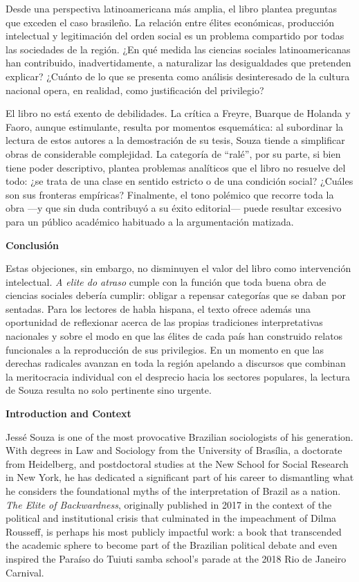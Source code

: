 Desde una perspectiva latinoamericana más amplia, el libro plantea preguntas que exceden el caso brasileño. La relación entre élites económicas, producción intelectual y legitimación del orden social es un problema compartido por todas las sociedades de la región. ¿En qué medida las ciencias sociales latinoamericanas han contribuido, inadvertidamente, a naturalizar las desigualdades que pretenden explicar? ¿Cuánto de lo que se presenta como análisis desinteresado de la cultura nacional opera, en realidad, como justificación del privilegio?

El libro no está exento de debilidades. La crítica a Freyre, Buarque de Holanda y Faoro, aunque estimulante, resulta por momentos esquemática: al subordinar la lectura de estos autores a la demostración de su tesis, Souza tiende a simplificar obras de considerable complejidad. La categoría de “ralé”, por su parte, si bien tiene poder descriptivo, plantea problemas analíticos que el libro no resuelve del todo: ¿se trata de una clase en sentido estricto o de una condición social? ¿Cuáles son sus fronteras empíricas? Finalmente, el tono polémico que recorre toda la obra —y que sin duda contribuyó a su éxito editorial— puede resultar excesivo para un público académico habituado a la argumentación matizada.

\textbf{Conclusión}

Estas objeciones, sin embargo, no disminuyen el valor del libro como intervención intelectual. \textit{A elite do atraso} cumple con la función que toda buena obra de ciencias sociales debería cumplir: obligar a repensar categorías que se daban por sentadas. Para los lectores de habla hispana, el texto ofrece además una oportunidad de reflexionar acerca de las propias tradiciones interpretativas nacionales y sobre el modo en que las élites de cada país han construido relatos funcionales a la reproducción de sus privilegios. En un momento en que las derechas radicales avanzan en toda la región apelando a discursos que combinan la meritocracia individual con el desprecio hacia los sectores populares, la lectura de Souza resulta no solo pertinente sino urgente.

\textbf{Introduction and Context}

Jessé Souza is one of the most provocative Brazilian sociologists of his generation. With degrees in Law and Sociology from the University of Brasília, a doctorate from Heidelberg, and postdoctoral studies at the New School for Social Research in New York, he has dedicated a significant part of his career to dismantling what he considers the foundational myths of the interpretation of Brazil as a nation. \textit{The Elite of Backwardness}, originally published in 2017 in the context of the political and institutional crisis that culminated in the impeachment of Dilma Rousseff, is perhaps his most publicly impactful work: a book that transcended the academic sphere to become part of the Brazilian political debate and even inspired the Paraíso do Tuiuti samba school’s parade at the 2018 Rio de Janeiro Carnival.


